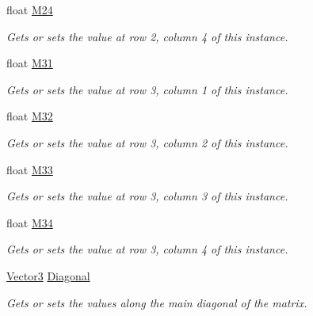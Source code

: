 \begin{DoxyCompactItemize}
float \hyperlink{struct_open_t_k_1_1_matrix3x4_ab10ec533c03c0636792e9d4925e856ec}{M24}
\begin{DoxyCompactList}\small\item\em Gets or sets the value at row 2, column 4 of this instance. \end{DoxyCompactList}\item 
float \hyperlink{struct_open_t_k_1_1_matrix3x4_a7956c211db10dadfd5bf1d58f9e0581b}{M31}
\begin{DoxyCompactList}\small\item\em Gets or sets the value at row 3, column 1 of this instance. \end{DoxyCompactList}\item 
float \hyperlink{struct_open_t_k_1_1_matrix3x4_ada71b6583156e27adb436282a5664500}{M32}
\begin{DoxyCompactList}\small\item\em Gets or sets the value at row 3, column 2 of this instance. \end{DoxyCompactList}\item 
float \hyperlink{struct_open_t_k_1_1_matrix3x4_a094b5cb01964e84b8969065e4d470f27}{M33}
\begin{DoxyCompactList}\small\item\em Gets or sets the value at row 3, column 3 of this instance. \end{DoxyCompactList}\item 
float \hyperlink{struct_open_t_k_1_1_matrix3x4_a9d8155b17cbf56237bdae3bb825f924e}{M34}
\begin{DoxyCompactList}\small\item\em Gets or sets the value at row 3, column 4 of this instance. \end{DoxyCompactList}\item 
\hyperlink{struct_open_t_k_1_1_vector3}{Vector3} \hyperlink{struct_open_t_k_1_1_matrix3x4_adf18ef38c1fa173d626017013ae808af}{Diagonal}
\begin{DoxyCompactList}\small\item\em Gets or sets the values along the main diagonal of the matrix. \end{DoxyCompactList}\item 

\end{DoxyCompactItemize}
